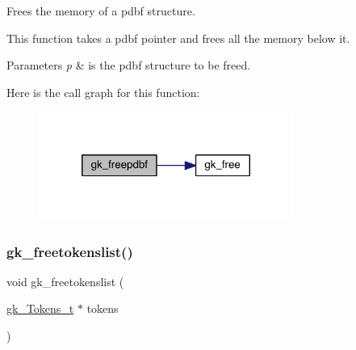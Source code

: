 Frees the memory of a pdbf structure. 

This function takes a pdbf pointer and frees all the memory below it.


\begin{DoxyParams}{Parameters}
{\em p} & is the pdbf structure to be freed. \\
\hline
\end{DoxyParams}
Here is the call graph for this function\+:\nopagebreak
\begin{figure}[H]
\begin{center}
\leavevmode
\includegraphics[width=236pt]{a00077_ab49542f55191276b91d65ad61a198ab2_cgraph}
\end{center}
\end{figure}
\mbox{\label{a00077_a721067a5b35f35422d141ad8652021ec}} 
\subsubsection{\texorpdfstring{gk\+\_\+freetokenslist()}{gk\_freetokenslist()}}
{\footnotesize\ttfamily void gk\+\_\+freetokenslist (\begin{DoxyParamCaption}\item[{\hyperlink{a00654}{gk\+\_\+\+Tokens\+\_\+t} $\ast$}]{tokens }\end{DoxyParamCaption})}

